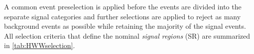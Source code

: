 



A common event preselection is applied before the events are divided into the separate signal categories and further selections are applied to reject as many background events as possible while retaining the majority of the signal events.
All selection criteria that define the nominal \emph{signal regions} (SR) are summarized in \cref{tab:HWWselection}. 

\begin{table}[!ht]
    \centering
    \caption{
    Event selection criteria used to define the nominal SRs in the \hww\ analysis. The definitions of the variables can be found in the text.
    \label{tab:HWWselection}
    }
    \resizebox{\textwidth}{!}{
    
    }
\end{table}


